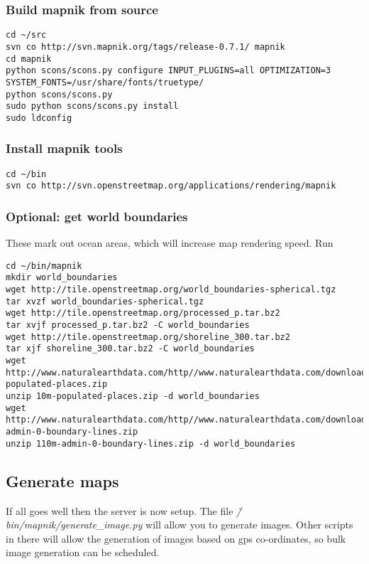 \subsubsection{Build mapnik from source}

\begin{verbatim}
cd ~/src
svn co http://svn.mapnik.org/tags/release-0.7.1/ mapnik
cd mapnik
python scons/scons.py configure INPUT_PLUGINS=all OPTIMIZATION=3 SYSTEM_FONTS=/usr/share/fonts/truetype/
python scons/scons.py
sudo python scons/scons.py install
sudo ldconfig
\end{verbatim}

\subsubsection{Install mapnik tools}

\begin{verbatim}
cd ~/bin
svn co http://svn.openstreetmap.org/applications/rendering/mapnik
\end{verbatim}

\subsubsection{Optional: get world boundaries}

These mark out ocean areas, which will increase map rendering speed. Run

\begin{verbatim}
cd ~/bin/mapnik
mkdir world_boundaries
wget http://tile.openstreetmap.org/world_boundaries-spherical.tgz
tar xvzf world_boundaries-spherical.tgz
wget http://tile.openstreetmap.org/processed_p.tar.bz2
tar xvjf processed_p.tar.bz2 -C world_boundaries
wget http://tile.openstreetmap.org/shoreline_300.tar.bz2
tar xjf shoreline_300.tar.bz2 -C world_boundaries
wget http://www.naturalearthdata.com/http//www.naturalearthdata.com/download/10m/cultural/10m-populated-places.zip
unzip 10m-populated-places.zip -d world_boundaries
wget http://www.naturalearthdata.com/http//www.naturalearthdata.com/download/110m/cultural/110m-admin-0-boundary-lines.zip
unzip 110m-admin-0-boundary-lines.zip -d world_boundaries
\end{verbatim}

\subsection{Generate maps}

If all goes well then the server is now setup. The file \emph{\~/bin/mapnik/generate\_image.py} will allow you to generate images. Other scripts in there will allow the generation of images based on gps co-ordinates, so bulk image generation can be scheduled.



